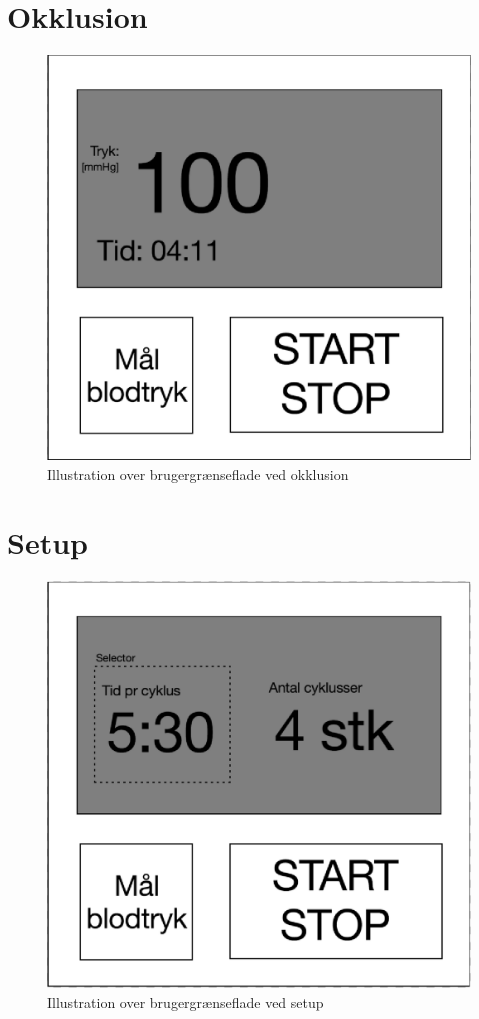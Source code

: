 \section{Okklusion}
\begin{figure}[H]
	\includegraphics[width=\textwidth]{Kravspecifikation/Illustrationer/OkklusionGUI}	
	\caption{Illustration over brugergrænseflade ved okklusion}
\end{figure}


\section{Setup}
\begin{figure}[H]
	\includegraphics[width=\textwidth]{Kravspecifikation/Illustrationer/SetupGUI}
	\caption{Illustration over brugergrænseflade ved setup}
\end{figure}


